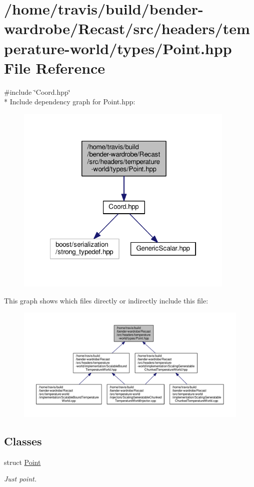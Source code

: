 \hypertarget{temperature-world_2types_2_point_8hpp}{\section{/home/travis/build/bender-\/wardrobe/\-Recast/src/headers/temperature-\/world/types/\-Point.hpp File Reference}
\label{temperature-world_2types_2_point_8hpp}
}
{\ttfamily \#include \char`\"{}Coord.\-hpp\char`\"{}}\\*
Include dependency graph for Point.\-hpp\-:
\nopagebreak
\begin{figure}[H]
\begin{center}
\leavevmode
\includegraphics[width=297pt]{temperature-world_2types_2_point_8hpp__incl}
\end{center}
\end{figure}
This graph shows which files directly or indirectly include this file\-:
\nopagebreak
\begin{figure}[H]
\begin{center}
\leavevmode
\includegraphics[width=350pt]{temperature-world_2types_2_point_8hpp__dep__incl}
\end{center}
\end{figure}
\subsection*{Classes}
\begin{DoxyCompactItemize}
\item 
struct \hyperlink{struct_point}{Point}
\begin{DoxyCompactList}\small\item\em Just point. \end{DoxyCompactList}\end{DoxyCompactItemize}
